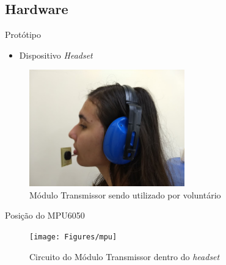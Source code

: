 \subsection{Hardware}




\begin{frame}{Prot\'otipo}
\begin{itemize}
    \item Dispositivo \textit{Headset}
\end{itemize}

\begin{figure}
	\includegraphics[width=0.6\textwidth]{Figures/voluntario_prototipo}\quad
	\caption{M\'odulo Transmissor sendo utilizado por volunt\'ario}
\end{figure}

\end{frame}
\begin{frame}{Posi\c c\~ao do MPU6050}

\begin{figure}
	\texttt{[image: Figures/mpu]}\quad
    \caption{Circuito do M\'odulo Transmissor dentro do \textit{headset}}
\end{figure}

\end{frame}




